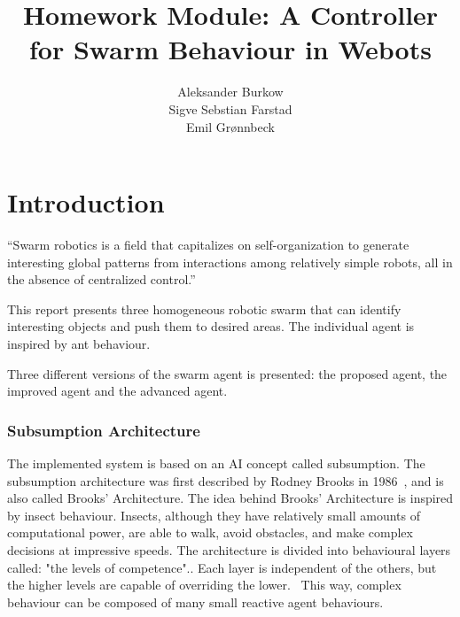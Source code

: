 \documentclass[a4paper]{article}
\title{Homework Module: A Controller for Swarm Behaviour in Webots}
\author{
    Aleksander Burkow \\
    Sigve Sebstian Farstad \\
    Emil Grønnbeck
}
\begin{document}

\maketitle
\thispagestyle{empty}


\newpage

\tableofcontents

\newpage
\setcounter{page}{1}

\part{Introduction}
\label{part:proposed-system}

``Swarm robotics is a field that capitalizes on self-organization to generate interesting global patterns from interactions among relatively simple robots, all in the absence of centralized control.''~\cite{course-page}

This report presents three homogeneous robotic swarm that can identify interesting objects and push them to desired areas.
The individual agent is inspired by ant behaviour.

Three different versions of the swarm agent is presented: the proposed agent, the improved agent and the advanced agent.



\section{Subsumption Architecture}
The implemented system is based on an AI concept called subsumption.
The subsumption architecture was first described by Rodney Brooks in 1986~\cite{brooks}, and is also called Brooks' Architecture.
The idea behind Brooks' Architecture is inspired by insect behaviour.
Insects, although they have relatively small amounts of computational power, are able to walk, avoid obstacles, and make complex decisions at impressive speeds.
The architecture is divided into behavioural layers called: "the levels of competence".\cite{mwarnerwu}.
Each layer is independent of the others, but the higher levels are capable of overriding the lower.~\cite{mwarnerwu}
This way, complex behaviour can be composed of many small reactive agent behaviours.
\end{document}
